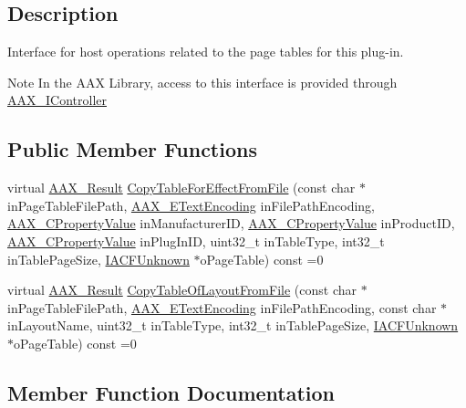 \subsection{Description}
Interface for host operations related to the page tables for this plug-\/in. 

\begin{DoxyNote}{Note}
In the A\+AX Library, access to this interface is provided through \mbox{\hyperlink{a01789}{A\+A\+X\+\_\+\+I\+Controller}} 
\end{DoxyNote}
\subsection*{Public Member Functions}
\begin{DoxyCompactItemize}
\item 
virtual \mbox{\hyperlink{a00392_a4d8f69a697df7f70c3a8e9b8ee130d2f}{A\+A\+X\+\_\+\+Result}} \mbox{\hyperlink{a01737_a6f5d2f9109b365c62c569b3dc344565f}{Copy\+Table\+For\+Effect\+From\+File}} (const char $\ast$in\+Page\+Table\+File\+Path, \mbox{\hyperlink{a00491_a8152e57310850693e4e7f00fc4922d74}{A\+A\+X\+\_\+\+E\+Text\+Encoding}} in\+File\+Path\+Encoding, \mbox{\hyperlink{a00392_ab247c0d8686c14e05cbb567ef276f249}{A\+A\+X\+\_\+\+C\+Property\+Value}} in\+Manufacturer\+ID, \mbox{\hyperlink{a00392_ab247c0d8686c14e05cbb567ef276f249}{A\+A\+X\+\_\+\+C\+Property\+Value}} in\+Product\+ID, \mbox{\hyperlink{a00392_ab247c0d8686c14e05cbb567ef276f249}{A\+A\+X\+\_\+\+C\+Property\+Value}} in\+Plug\+In\+ID, uint32\+\_\+t in\+Table\+Type, int32\+\_\+t in\+Table\+Page\+Size, \mbox{\hyperlink{a01409}{I\+A\+C\+F\+Unknown}} $\ast$o\+Page\+Table) const =0
\item 
virtual \mbox{\hyperlink{a00392_a4d8f69a697df7f70c3a8e9b8ee130d2f}{A\+A\+X\+\_\+\+Result}} \mbox{\hyperlink{a01737_a80c711274a466f9a0333ac0c322763db}{Copy\+Table\+Of\+Layout\+From\+File}} (const char $\ast$in\+Page\+Table\+File\+Path, \mbox{\hyperlink{a00491_a8152e57310850693e4e7f00fc4922d74}{A\+A\+X\+\_\+\+E\+Text\+Encoding}} in\+File\+Path\+Encoding, const char $\ast$in\+Layout\+Name, uint32\+\_\+t in\+Table\+Type, int32\+\_\+t in\+Table\+Page\+Size, \mbox{\hyperlink{a01409}{I\+A\+C\+F\+Unknown}} $\ast$o\+Page\+Table) const =0
\end{DoxyCompactItemize}


\subsection{Member Function Documentation}
\mbox{\label{a01737_a6f5d2f9109b365c62c569b3dc344565f}} 
